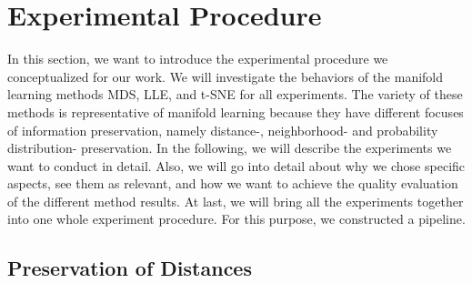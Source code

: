 \section{Experimental Procedure} \label{sec:exp.prod}

In this section, we want to introduce the experimental procedure we conceptualized for our work. We will investigate the behaviors of the manifold learning methods MDS, LLE, and t-SNE for all experiments. The variety of these methods is representative of manifold learning because they have different focuses of information preservation, namely distance-, neighborhood- and probability distribution- preservation. In the following, we will describe the experiments we want to conduct in detail. Also, we will go into detail about why we chose specific aspects, see them as relevant, and how we want to achieve the quality evaluation of the different method results. At last, we will bring all the experiments together into one whole experiment procedure. For this purpose, we constructed a pipeline.

\subsection{Preservation of Distances} \label{subsec:dist}

